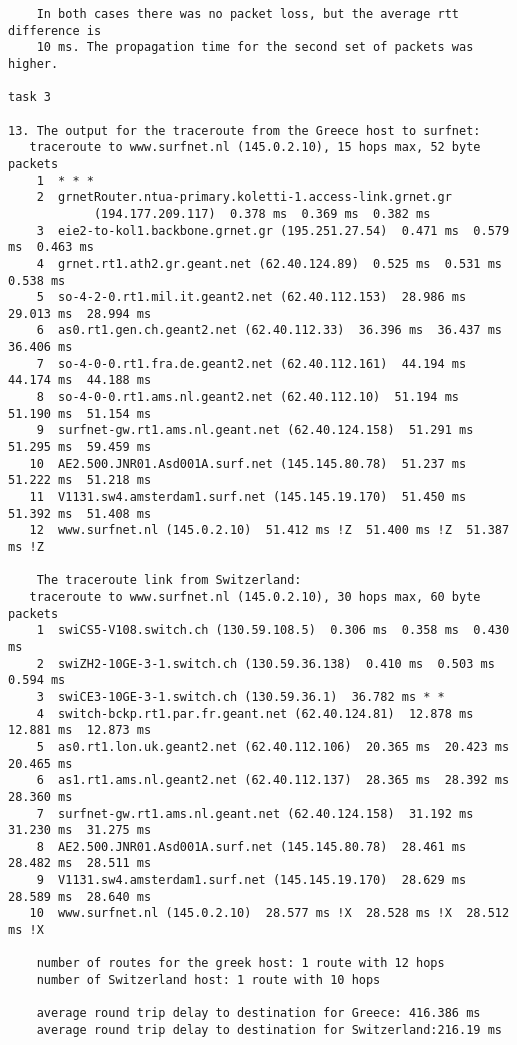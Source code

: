 \documentclass[12pt]{article} %
\begin{document}
\begin{verbatim}
    In both cases there was no packet loss, but the average rtt difference is 
    10 ms. The propagation time for the second set of packets was higher.

task 3

13. The output for the traceroute from the Greece host to surfnet:
   traceroute to www.surfnet.nl (145.0.2.10), 15 hops max, 52 byte packets
    1  * * *
    2  grnetRouter.ntua-primary.koletti-1.access-link.grnet.gr 
            (194.177.209.117)  0.378 ms  0.369 ms  0.382 ms
    3  eie2-to-kol1.backbone.grnet.gr (195.251.27.54)  0.471 ms  0.579 ms  0.463 ms
    4  grnet.rt1.ath2.gr.geant.net (62.40.124.89)  0.525 ms  0.531 ms  0.538 ms
    5  so-4-2-0.rt1.mil.it.geant2.net (62.40.112.153)  28.986 ms  29.013 ms  28.994 ms
    6  as0.rt1.gen.ch.geant2.net (62.40.112.33)  36.396 ms  36.437 ms  36.406 ms
    7  so-4-0-0.rt1.fra.de.geant2.net (62.40.112.161)  44.194 ms  44.174 ms  44.188 ms
    8  so-4-0-0.rt1.ams.nl.geant2.net (62.40.112.10)  51.194 ms  51.190 ms  51.154 ms
    9  surfnet-gw.rt1.ams.nl.geant.net (62.40.124.158)  51.291 ms  51.295 ms  59.459 ms
   10  AE2.500.JNR01.Asd001A.surf.net (145.145.80.78)  51.237 ms  51.222 ms  51.218 ms
   11  V1131.sw4.amsterdam1.surf.net (145.145.19.170)  51.450 ms  51.392 ms  51.408 ms
   12  www.surfnet.nl (145.0.2.10)  51.412 ms !Z  51.400 ms !Z  51.387 ms !Z
    
    The traceroute link from Switzerland:
   traceroute to www.surfnet.nl (145.0.2.10), 30 hops max, 60 byte packets
    1  swiCS5-V108.switch.ch (130.59.108.5)  0.306 ms  0.358 ms  0.430 ms
    2  swiZH2-10GE-3-1.switch.ch (130.59.36.138)  0.410 ms  0.503 ms  0.594 ms
    3  swiCE3-10GE-3-1.switch.ch (130.59.36.1)  36.782 ms * *
    4  switch-bckp.rt1.par.fr.geant.net (62.40.124.81)  12.878 ms  12.881 ms  12.873 ms
    5  as0.rt1.lon.uk.geant2.net (62.40.112.106)  20.365 ms  20.423 ms  20.465 ms
    6  as1.rt1.ams.nl.geant2.net (62.40.112.137)  28.365 ms  28.392 ms  28.360 ms
    7  surfnet-gw.rt1.ams.nl.geant.net (62.40.124.158)  31.192 ms  31.230 ms  31.275 ms
    8  AE2.500.JNR01.Asd001A.surf.net (145.145.80.78)  28.461 ms  28.482 ms  28.511 ms
    9  V1131.sw4.amsterdam1.surf.net (145.145.19.170)  28.629 ms  28.589 ms  28.640 ms
   10  www.surfnet.nl (145.0.2.10)  28.577 ms !X  28.528 ms !X  28.512 ms !X

    number of routes for the greek host: 1 route with 12 hops
    number of Switzerland host: 1 route with 10 hops

    average round trip delay to destination for Greece: 416.386 ms
    average round trip delay to destination for Switzerland:216.19 ms
        

\end{verbatim}
\end{document}
